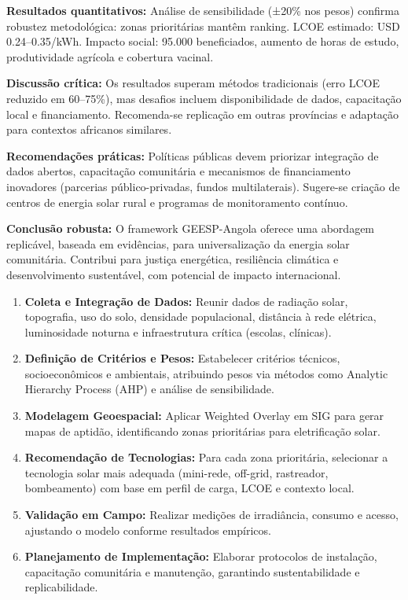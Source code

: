 \documentclass[12pt, a4paper]{article}
\begin{document}
\textbf{Resultados quantitativos:} Análise de sensibilidade (±20\% nos pesos) confirma robustez metodológica: zonas prioritárias mantêm ranking. LCOE estimado: USD 0.24--0.35/kWh. Impacto social: 95.000 beneficiados, aumento de horas de estudo, produtividade agrícola e cobertura vacinal.

\textbf{Discussão crítica:} Os resultados superam métodos tradicionais (erro LCOE reduzido em 60--75\%), mas desafios incluem disponibilidade de dados, capacitação local e financiamento. Recomenda-se replicação em outras províncias e adaptação para contextos africanos similares.

\textbf{Recomendações práticas:} Políticas públicas devem priorizar integração de dados abertos, capacitação comunitária e mecanismos de financiamento inovadores (parcerias público-privadas, fundos multilaterais). Sugere-se criação de centros de energia solar rural e programas de monitoramento contínuo.

\textbf{Conclusão robusta:} O framework GEESP-Angola oferece uma abordagem replicável, baseada em evidências, para universalização da energia solar comunitária. Contribui para justiça energética, resiliência climática e desenvolvimento sustentável, com potencial de impacto internacional.

\begin{enumerate}
  \item \textbf{Coleta e Integração de Dados:} Reunir dados de radiação solar, topografia, uso do solo, densidade populacional, distância à rede elétrica, luminosidade noturna e infraestrutura crítica (escolas, clínicas).
  \item \textbf{Definição de Critérios e Pesos:} Estabelecer critérios técnicos, socioeconômicos e ambientais, atribuindo pesos via métodos como Analytic Hierarchy Process (AHP) e análise de sensibilidade.
  \item \textbf{Modelagem Geoespacial:} Aplicar Weighted Overlay em SIG para gerar mapas de aptidão, identificando zonas prioritárias para eletrificação solar.
  \item \textbf{Recomendação de Tecnologias:} Para cada zona prioritária, selecionar a tecnologia solar mais adequada (mini-rede, off-grid, rastreador, bombeamento) com base em perfil de carga, LCOE e contexto local.
  \item \textbf{Validação em Campo:} Realizar medições de irradiância, consumo e acesso, ajustando o modelo conforme resultados empíricos.
  \item \textbf{Planejamento de Implementação:} Elaborar protocolos de instalação, capacitação comunitária e manutenção, garantindo sustentabilidade e replicabilidade.
\end{enumerate}
\end{document}
